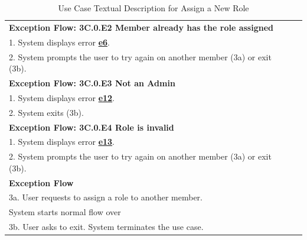 \documentclass[fontsize=12pt,paper=letter,twoside]{scrartcl}
\begin{document}
\begin{table}[!htb]
\begin{center}
\begin{tabular}{|l|l|}
\\ \hline
\textbf{Exception Flow: 3C.0.E2 Member already has the role assigned}
\\ 1. System displays error \hyperref[app:error]{\textbf{e6}}.
\\ 2. System prompts the user to try again on another member (3a) or exit (3b).
\\ \hline
\textbf{Exception Flow: 3C.0.E3 Not an Admin}
\\ 1. System displays error  \hyperref[app:error]{\textbf{e12}}.
\\ 2. System exits (3b). \\ \hline 
\textbf{Exception Flow: 3C.0.E4 Role is invalid} 
\\ 1. System displays error  \hyperref[app:error]{\textbf{e13}}.
\\ 2. System prompts the user to try again on another member (3a) or exit (3b). \\ \hline 
\textbf{Exception Flow}
\\ 3a. User requests to assign a role to another member. \\System starts normal flow over
\\ 3b. User asks to exit. System terminates the use case.\\ \hline
\end{tabular}
\end{center}
\caption {Use Case Textual Description for Assign a New Role}
\label{tbl:uc3Ctd}
\end{table}
\end{document}
